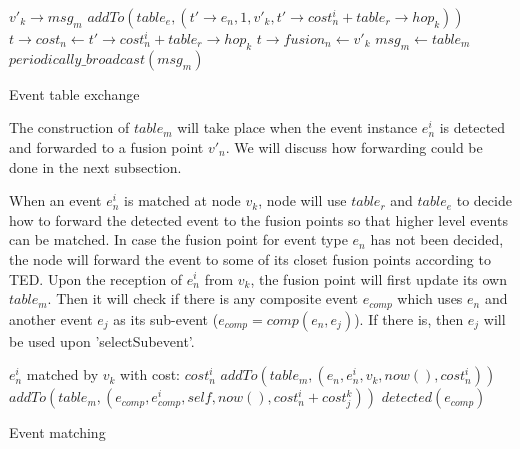 \begin{algorithm}
\begin{algorithmic}
\REQUIRE \(v'_k\rightarrow msg_m\)
			\STATE \(addTo(table_e, (t'\rightarrow e_n, 1, v'_k, t'\rightarrow cost_n^i+table_r\rightarrow hop_k))\)
		\ENDIF
					\STATE \(t\rightarrow cost_n \gets t'\rightarrow cost_n^i+table_r\rightarrow hop_k\)
					\STATE \(t\rightarrow fusion_n \gets v'_k\)
				\ENDIF
			\ENDIF
		\ENDFOR
	\ENDFOR
		\STATE \(msg_m \gets table_m\)
		\STATE \(periodically\_broadcast(msg_m)\)
	\ENDIF
\end{algorithmic}
\caption{Event table exchange}
\label{algo:table_e}
\end{algorithm}

The construction of \(table_m\) will take place when the event instance \(e_n^i\) is detected and forwarded to a fusion point \(v'_n\). We will discuss how forwarding could be done in the next subsection.

When an event \(e_n^i\) is matched at node \(v_k\), node will use \(table_r\) and \(table_e\) to decide how to forward the detected event to the fusion points so that higher level events can be matched. In case the fusion point for event type \(e_n\) has not been decided, the node will forward the event to some of its closet fusion points  according to TED. Upon the reception of \(e_n^i\) from \(v_k\), the fusion point will first update its own \(table_m\). Then it will check if there is any composite event \(e_{comp}\) which uses \(e_n\) and another event \(e_j\) as its sub-event (\(e_{comp}=comp(e_n, e_j)\)). If there is, then \(e_j\) will be used upon 'selectSubevent'.

\begin{algorithm}
\begin{algorithmic}
\REQUIRE \(e_n^i\) matched by \(v_k\) with cost: \(cost_n^i\)
	\STATE \(addTo(table_m, (e_n, e_n^i, v_k, now(), cost_n^i))\)
					\STATE \(addTo(table_m, (e_{comp}, e_{comp}^i, self, now(), cost_n^i+cost_j^k))\)
					\STATE \(detected(e_{comp})\)
				\ENDIF
			\ENDFOR
		\ENDIF
	\ENDFOR
\end{algorithmic}
\caption{Event matching}
\label{algo:eventmatching}
\end{algorithm}

